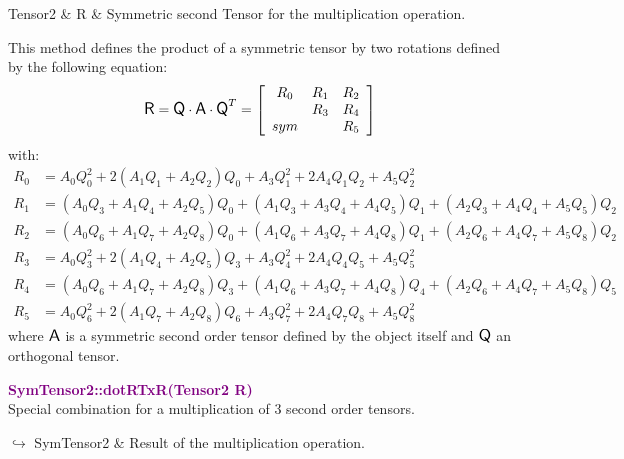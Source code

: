 \begin{tcolorbox}[width=\textwidth,myArgs,tabularx={ll|R}]
Tensor2 & R & Symmetric second Tensor for the multiplication operation.
\end{tcolorbox}

This method defines the product of a symmetric tensor by two rotations defined by the following equation:
\begin{equation*}
\mbox{\large\ensuremath{\mathsf{R}}} = \mbox{\large\ensuremath{\mathsf{Q}}} \cdot \mbox{\large\ensuremath{\mathsf{A}}} \cdot \mbox{\large\ensuremath{\mathsf{Q}}}^T =\left[\begin{array}{ccc}
R_0 & R_1 & R_2\\
& R_3 & R_4\\
sym &  & R_5
\end{array}\right]
\end{equation*}
with:
\begin{align*}
R_0 & = A_0 Q_0^2 + 2 (A_1 Q_1 + A_2 Q_2)Q_0 + A_3 Q_1^2 + 2 A_4 Q_1 Q_2 + A_5 Q_2^2\\
R_1 & = (A_0 Q_3 + A_1 Q_4 + A_2 Q_5)Q_0 + (A_1 Q_3 + A_3 Q_4 + A_4 Q_5)Q_1 + (A_2 Q_3 + A_4 Q_4 + A_5 Q_5)Q_2\\
R_2 & = (A_0 Q_6 + A_1 Q_7 + A_2 Q_8)Q_0 + (A_1 Q_6 + A_3 Q_7 + A_4 Q_8)Q_1 + (A_2 Q_6 + A_4 Q_7 + A_5 Q_8)Q_2\\
R_3 & = A_0 Q_3^2 + 2 (A_1 Q_4 + A_2 Q_5)Q_3+ A_3 Q_4^2 + 2 A_4 Q_4 Q_5 + A_5 Q_5^2\\
R_4 & = (A_0 Q_6 + A_1 Q_7 + A_2 Q_8)Q_3 + (A_1 Q_6 + A_3 Q_7 + A_4 Q_8)Q_4 + (A_2 Q_6 + A_4 Q_7 + A_5 Q_8)Q_5\\
R_5 & = A_0 Q_6^2 + 2 (A_1 Q_7 + A_2 Q_8)Q_6+ A_3 Q_7^2 + 2 A_4 Q_7 Q_8 + A_5 Q_8^2
\end{align*}
where $\mbox{\large\ensuremath{\mathsf{A}}}$ is a symmetric second order tensor defined by the object itself and $\mbox{\large\ensuremath{\mathsf{Q}}}$ an orthogonal tensor.

\textcolor{purple}{\textbf{SymTensor2::dotRTxR(Tensor2 R)}}\label{SymTensor2::dotRTxR(Tensor2 R)}\\
Special combination for a multiplication of 3 second order tensors.\vspace*{-0.5em}
\begin{tcolorbox}[grow to left by=-1cm, width=\textwidth-1cm,myArgs,tabularx={l|R}]
$\hookrightarrow$ SymTensor2 & Result of the multiplication operation.
\end{tcolorbox}

